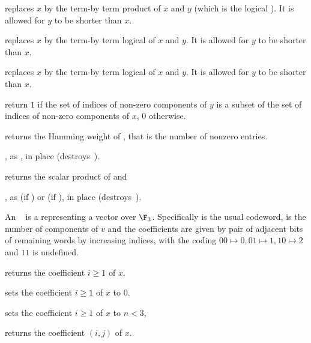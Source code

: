  replaces $x$ by the term-by term product
of $x$ and $y$ (which is the logical ). It is allowed for $y$ to be
shorter than $x$.

 replaces $x$ by the term-by term
logical  of $x$ and $y$. It is allowed for $y$ to be
shorter than $x$.

 replaces $x$ by the term-by term
logical  of $x$ and $y$. It is allowed for $y$ to be
shorter than $x$.

 return $1$ if the set of indices of
non-zero components of $y$ is a subset of the set of indices of
non-zero components of $x$, $0$ otherwise.

 returns the Hamming weight of , that is
the number of nonzero entries.


, as , in place (destroys~).


 returns the scalar product of 
and 



, as  (if
) or  (if ), in place
(destroys~).

  An ~ is a
 representing a vector over $\F_3$. Specifically  is
the usual codeword,  is the number of components of $v$ and the
coefficients are given by pair of adjacent bits of remaining words by
increasing indices, with the coding $00\mapsto 0, 01\mapsto 1, 10\mapsto 2$ and
$11$ is undefined.

 returns the coefficient $i\ge 1$ of $x$.

 sets the coefficient $i\ge 1$ of $x$ to
$0$.

 sets the coefficient $i\ge 1$ of
$x$ to $n<3$,

 returns the coefficient $(i,j)$
of $x$.

